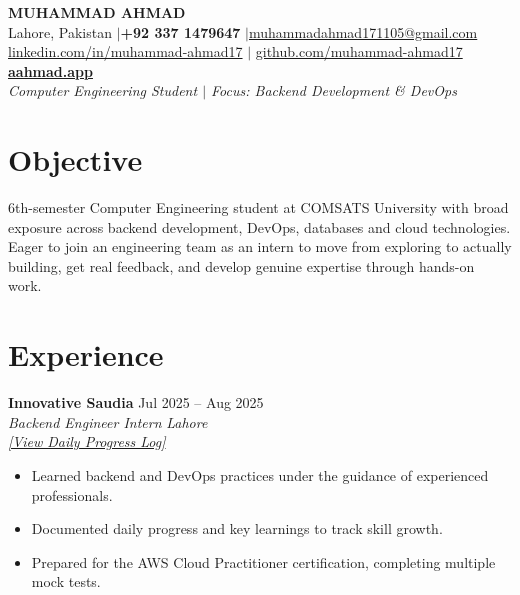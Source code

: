 \documentclass[a4paper,10.5pt]{article}
\newcommand{\entrytitle}[2]{%
  \textbf{#1} \hfill #2%
}
\newcommand{\entrysubtitle}[2]{%
  \textit{#1} \hfill \textit{#2}%
}
\begin{document}
\begin{center}
  {\sffamily\Huge\textbf{MUHAMMAD AHMAD}} \\[5pt]
  Lahore, Pakistan \enspace$|$\enspace \textbf{+92 337 1479647} \enspace$|$\enspace \href{mailto:muhammadahmad171105@gmail.com}{muhammadahmad171105@gmail.com} \\[2pt]
  \href{https://linkedin.com/in/muhammad-ahmad17}{linkedin.com/in/muhammad-ahmad17} \enspace$|$\enspace 
  \href{https://github.com/muhammad-ahmad17}{github.com/muhammad-ahmad17} \\[4pt]
  \textbf{\href{https://aahmad.app}{aahmad.app}} \\[3pt]
  \textit{Computer Engineering Student $|$ Focus: Backend Development \& DevOps}
\end{center}

\section{Objective}
6th-semester Computer Engineering student at COMSATS University with broad exposure across backend development, DevOps, databases and cloud technologies. Eager to join an engineering team as an intern to move from exploring to actually building, get real feedback, and develop genuine expertise through hands-on work.
\section{Experience}

\entrytitle{Innovative Saudia}{Jul 2025 -- Aug 2025} \\
\entrysubtitle{Backend Engineer Intern}{Lahore} \\
{\small\textit{\href{https://github.com/Muhammad-Ahmad17/Internship}{[View Daily Progress Log]}}}
\normalsize
\begin{itemize}[nosep, leftmargin=1.5em, topsep=2pt]
  \item Learned backend and DevOps practices under the guidance of experienced professionals.
  \item Documented daily progress and key learnings to track skill growth.
  \item Prepared for the AWS Cloud Practitioner certification, completing multiple mock tests.
\end{itemize}
\end{document}
